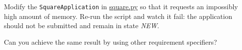 \documentclass[english,serif,mathserif,xcolor=pdftex,dvipsnames,table]{beamer}
\begin{document}
\begin{frame}
  \begin{exercise}
    Modify the \texttt{SquareApplication} in
    \href{http://www.gc3.uzh.ch/teaching/gc3pie2012/square.py}{square.py}
    so that it requests an impossibly high amount of memory. Re-run
    the script and watch it fail: the application should not be
    submitted and remain in state \emph{NEW}.

    \+
    Can you achieve the same result by using other requirement specifiers?
  \end{exercise}
\end{frame}
\end{document}

